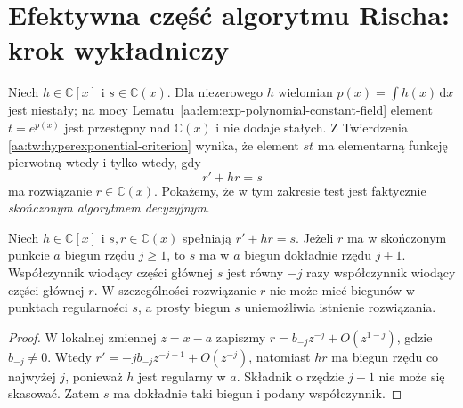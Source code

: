 \section{Efektywna część algorytmu Rischa: krok wykładniczy}

Niech $h\in\mathbb C[x]$ i $s\in\mathbb C(x)$.
Dla niezerowego $h$ wielomian
$p(x)=\int h(x)\,\mathrm dx$
jest niestały; na mocy
Lematu~\ref{aa:lem:exp-polynomial-constant-field}
element $t=e^{p(x)}$ jest
przestępny nad $\mathbb C(x)$
i nie dodaje stałych.
Z Twierdzenia
\ref{aa:tw:hyperexponential-criterion}
wynika, że element
$st$ ma elementarną funkcję pierwotną
wtedy i tylko wtedy, gdy
\begin{equation}\label{aa:eq:risch-first-order}
 r'+hr=s
\end{equation}
ma rozwiązanie $r\in\mathbb C(x)$.
Pokażemy, że w tym zakresie
test jest faktycznie \emph{skończonym
algorytmem decyzyjnym}.

\begin{lemat}
\label{aa:lem:risch-poles}
Niech $h\in\mathbb C[x]$ i
$s,r\in\mathbb C(x)$ spełniają
$r'+hr=s$. Jeżeli $r$ ma
w skończonym punkcie $a$
biegun rzędu $j\ge1$, to
$s$ ma w $a$ biegun dokładnie
rzędu $j+1$. Współczynnik
wiodący części głównej $s$
jest równy $-j$ razy
współczynnik wiodący
części głównej $r$.
W szczególności rozwiązanie
$r$ nie może mieć biegunów
w punktach regularności $s$,
a prosty biegun $s$ uniemożliwia
istnienie rozwiązania.
\end{lemat}
\begin{proof}
W lokalnej zmiennej $z=x-a$
zapiszmy $r=b_{-j}z^{-j}+
O(z^{1-j})$, gdzie $b_{-j}\ne0$.
Wtedy $r'=-j b_{-j}z^{-j-1}
+O(z^{-j})$, natomiast
$hr$ ma biegun rzędu
co najwyżej $j$, ponieważ
$h$ jest regularny w $a$.
Składnik o rzędzie $j+1$
nie może się skasować.
Zatem $s$ ma dokładnie
taki biegun i podany
współczynnik.
\end{proof}


